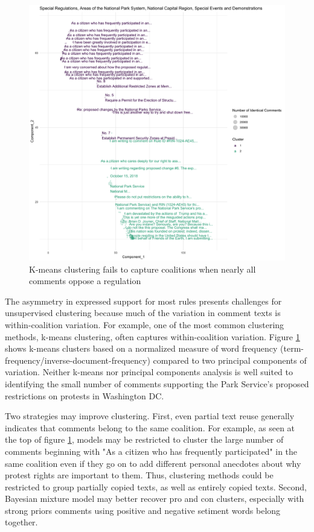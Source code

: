 \begin{figure}[h!]
    \caption{K-means clustering fails to capture coalitions when nearly all comments oppose a regulation}
    \label{fig:kmeans}
    \centering
    \includegraphics[width = 7in]{Figs/kmeans.png}
\end{figure}

The asymmetry in expressed support for most rules presents challenges for unsupervised clustering because much of the variation in comment texts is within-coalition variation. For example, one of the most common clustering methods, k-means clustering, often captures within-coalition variation. Figure \ref{fig:kmeans} shows k-means clusters based on a normalized measure of word frequency (term-frequency/inverse-document-frequency) compared to two principal components of variation. Neither k-means nor principal components analysis is well suited to identifying the small number of comments supporting the Park Service's proposed restrictions on protests in Washington DC.

Two strategies may improve clustering. First, even partial text reuse generally indicates that comments belong to the same coalition. For example, as seen at the top of figure \ref{fig:kmeans}, models may be restricted to cluster the large number of comments beginning with "As a citizen who has frequently participated" in the same coalition even if they go on to add different personal anecdotes about why protest rights are important to them. Thus, clustering methods could be restricted to group partially copied texts, as well as entirely copied texts. Second, Bayesian mixture model may better recover pro and con clusters, especially with strong priors comments using positive and negative setiment words belong together.




